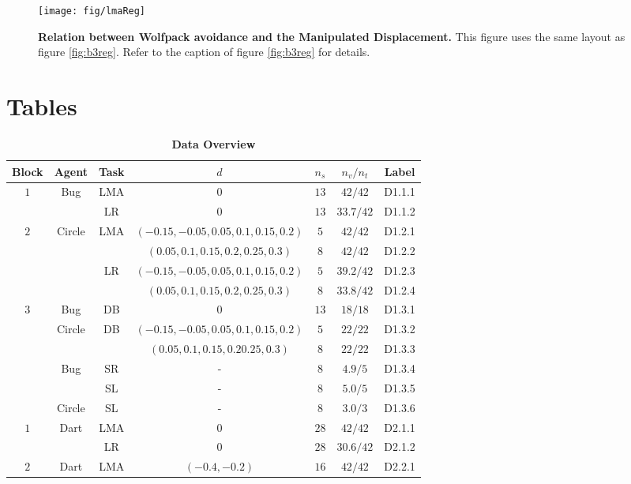\documentclass[10pt]{article}
\begin{document}
\begin{figure}[!ht]
\begin{center}
\texttt{[image: fig/lmaReg]}
\end{center}
\caption{
{\bf Relation between Wolfpack avoidance and the Manipulated Displacement.}
This figure uses the same layout as figure \ref{fig:b3reg}. Refer to the caption of figure \ref{fig:b3reg} for details.
}\label{fig:lmaReg}
\end{figure}

\section*{Tables}
\begin{table}[!ht]
\caption{
\bf{Data Overview}}
\begin{tabular}{|c|c|c|c|c|c|c|}
\hline
Block & Agent & Task & $d$ & $n_s$ & $n_v/n_t$ & Label\\
\hline
$1$ & Bug & LMA & $0$ & $13$ & $42/42$ & D1.1.1 \\
\hline
 & & LR & $0$ & $13$ & $33.7/42$ & D1.1.2 \\
\hline
 $2$ & Circle & LMA & $(-0.15, -0.05, 0.05, 0.1, 0.15, 0.2)$ & $5$ & $42/42$  & D1.2.1\\
\hline
 &  & & $(0.05, 0.1,0.15, 0.2, 0.25,0.3)$ & $8$ & $42/42$ & D1.2.2\\
\hline
 & & LR & $(-0.15, -0.05, 0.05, 0.1, 0.15, 0.2)$ & $5$ & $39.2/42$& D1.2.3 \\
\hline
 &  &  & $(0.05, 0.1,0.15, 0.2, 0.25,0.3)$ & $8$ & $33.8/42$ & D1.2.4 \\
\hline
 $3$ & Bug & DB & $0$ & $13$ & $18/18$ & D1.3.1\\
\hline
 & Circle & DB & $(-0.15, -0.05, 0.05, 0.1, 0.15, 0.2)$ & $5$ & $22/22$ & D1.3.2\\
\hline
 & & & $(0.05, 0.1,0.15, 0.2 0.25,0.3)$ & $8$ & $22/22$ & D1.3.3\\
\hline
 & Bug & SR & - & $8$ & $4.9/5$ & D1.3.4\\
\hline
 & & SL & - & $8$ & $5.0/5$ & D1.3.5\\
\hline
 & Circle & SL & - & $8$ & $3.0/3$ & D1.3.6\\
\hline
 $1$ & Dart & LMA & $0$ & $28$ & $42/42$ & D2.1.1 \\
\hline
 & & LR & $0$ & $28$ & $30.6/42$ & D2.1.2\\
\hline
$2$ & Dart & LMA & $(-0.4,-0.2)$ & $16$ & $42/42$ & D2.2.1  \\

\end{tabular}
\end{table}
\end{document}
